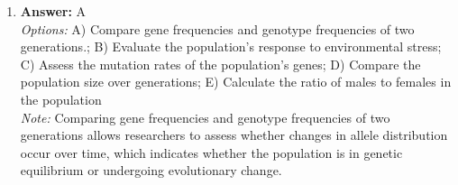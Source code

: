 \documentclass[12pt]{article}
\begin{document}
\begin{enumerate}[label=\arabic*.]
\\ \textit{Note:} The correct answer is based on Darwin's theory of evolution, which posits that humans and apes share a common ancestor, leading to the misconception that he proposed humans evolved directly from apes, while he actually emphasized the broader concept of evolution through natural selection.
\item \textbf{Answer:} A
\\ \textit{Options:} A) Compare gene frequencies and genotype frequencies of two generations.; B) Evaluate the population's response to environmental stress; C) Assess the mutation rates of the population's genes; D) Compare the population size over generations; E) Calculate the ratio of males to females in the population
\\ \textit{Note:} Comparing gene frequencies and genotype frequencies of two generations allows researchers to assess whether changes in allele distribution occur over time, which indicates whether the population is in genetic equilibrium or undergoing evolutionary change.
\end{enumerate}
\end{document}
